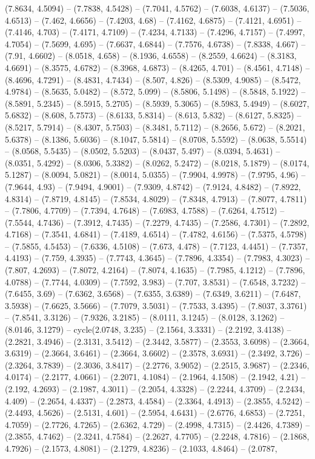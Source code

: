(7.8634, 4.5094) -- (7.7838, 4.5428) -- (7.7041, 4.5762) -- (7.6038, 4.6137) -- (7.5036, 4.6513) -- (7.462, 4.6656) -- (7.4203, 4.68) -- (7.4162, 4.6875) -- (7.4121, 4.6951) -- (7.4146, 4.703) -- (7.4171, 4.7109) -- (7.4234, 4.7133) -- (7.4296, 4.7157) -- (7.4997, 4.7054) -- (7.5699, 4.695) -- (7.6637, 4.6844) -- (7.7576, 4.6738) -- (7.8338, 4.667) -- (7.91, 4.6602) -- (8.0518, 4.658) -- (8.1936, 4.6558) -- (8.2559, 4.6624) -- (8.3183, 4.6691) -- (8.3575, 4.6782) -- (8.3968, 4.6873) -- (8.4265, 4.701) -- (8.4561, 4.7148) -- (8.4696, 4.7291) -- (8.4831, 4.7434) -- (8.507, 4.826) -- (8.5309, 4.9085) -- (8.5472, 4.9784) -- (8.5635, 5.0482) -- (8.572, 5.099) -- (8.5806, 5.1498) -- (8.5848, 5.1922) -- (8.5891, 5.2345) -- (8.5915, 5.2705) -- (8.5939, 5.3065) -- (8.5983, 5.4949) -- (8.6027, 5.6832) -- (8.608, 5.7573) -- (8.6133, 5.8314) -- (8.613, 5.832) -- (8.6127, 5.8325) -- (8.5217, 5.7914) -- (8.4307, 5.7503) -- (8.3481, 5.7112) -- (8.2656, 5.672) -- (8.2021, 5.6378) -- (8.1386, 5.6036) -- (8.1047, 5.5814) -- (8.0708, 5.5592) -- (8.0638, 5.5514) -- (8.0568, 5.5435) -- (8.0502, 5.5203) -- (8.0437, 5.497) -- (8.0394, 5.4631) -- (8.0351, 5.4292) -- (8.0306, 5.3382) -- (8.0262, 5.2472) -- (8.0218, 5.1879) -- (8.0174, 5.1287) -- (8.0094, 5.0821) -- (8.0014, 5.0355) -- (7.9904, 4.9978) -- (7.9795, 4.96) -- (7.9644, 4.93) -- (7.9494, 4.9001) -- (7.9309, 4.8742) -- (7.9124, 4.8482) -- (7.8922, 4.8314) -- (7.8719, 4.8145) -- (7.8534, 4.8029) -- (7.8348, 4.7913) -- (7.8077, 4.7811) -- (7.7806, 4.7709) -- (7.7394, 4.7648) -- (7.6983, 4.7588) -- (7.6264, 4.7512) -- (7.5544, 4.7436) -- (7.3912, 4.7435) -- (7.2279, 4.7435) -- (7.2586, 4.7301) -- (7.2892, 4.7168) -- (7.3541, 4.6841) -- (7.4189, 4.6514) -- (7.4782, 4.6156) -- (7.5375, 4.5798) -- (7.5855, 4.5453) -- (7.6336, 4.5108) -- (7.673, 4.478) -- (7.7123, 4.4451) -- (7.7357, 4.4193) -- (7.759, 4.3935) -- (7.7743, 4.3645) -- (7.7896, 4.3354) -- (7.7983, 4.3023) -- (7.807, 4.2693) -- (7.8072, 4.2164) -- (7.8074, 4.1635) -- (7.7985, 4.1212) -- (7.7896, 4.0788) -- (7.7744, 4.0309) -- (7.7592, 3.983) -- (7.707, 3.8531) -- (7.6548, 3.7232) -- (7.6455, 3.69) -- (7.6362, 3.6568) -- (7.6355, 3.6389) -- (7.6349, 3.6211) -- (7.6487, 3.5938) -- (7.6625, 3.5666) -- (7.7079, 3.5031) -- (7.7533, 3.4395) -- (7.8037, 3.3761) -- (7.8541, 3.3126) -- (7.9326, 3.2185) -- (8.0111, 3.1245) -- (8.0128, 3.1262) -- (8.0146, 3.1279) -- cycle(2.0748, 3.235) -- (2.1564, 3.3331) -- (2.2192, 3.4138) -- (2.2821, 3.4946) -- (2.3131, 3.5412) -- (2.3442, 3.5877) -- (2.3553, 3.6098) -- (2.3664, 3.6319) -- (2.3664, 3.6461) -- (2.3664, 3.6602) -- (2.3578, 3.6931) -- (2.3492, 3.726) -- (2.3264, 3.7839) -- (2.3036, 3.8417) -- (2.2776, 3.9052) -- (2.2515, 3.9687) -- (2.2346, 4.0174) -- (2.2177, 4.0661) -- (2.2071, 4.1084) -- (2.1964, 4.1508) -- (2.1942, 4.21) -- (2.192, 4.2693) -- (2.1987, 4.3011) -- (2.2054, 4.3328) -- (2.2244, 4.3709) -- (2.2434, 4.409) -- (2.2654, 4.4337) -- (2.2873, 4.4584) -- (2.3364, 4.4913) -- (2.3855, 4.5242) -- (2.4493, 4.5626) -- (2.5131, 4.601) -- (2.5954, 4.6431) -- (2.6776, 4.6853) -- (2.7251, 4.7059) -- (2.7726, 4.7265) -- (2.6362, 4.729) -- (2.4998, 4.7315) -- (2.4426, 4.7389) -- (2.3855, 4.7462) -- (2.3241, 4.7584) -- (2.2627, 4.7705) -- (2.2248, 4.7816) -- (2.1868, 4.7926) -- (2.1573, 4.8081) -- (2.1279, 4.8236) -- (2.1033, 4.8464) -- (2.0787, 